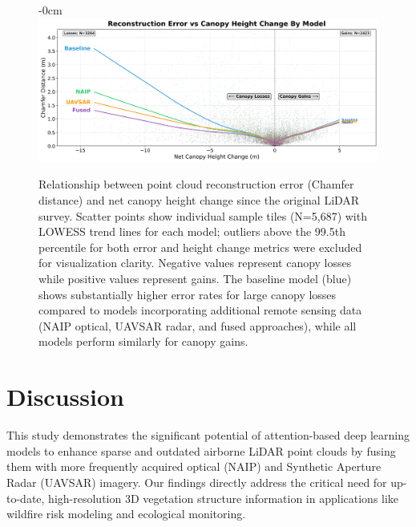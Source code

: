 \documentclass[remotesensing,article,submit,pdftex,moreauthors]{Definitions/mdpi}
\newenvironment{widefigure}[1][]{%
  \begin{figure}[#1]\begin{adjustwidth}{-\extralength}{0cm}\centering}{%
  \end{adjustwidth}\end{figure}}
\begin{document}
\begin{widefigure}
    \vspace{-20pt}
    \centering
    \includegraphics[width=1\linewidth]{manuscript/figures/error_vs_cnpy_chng.png}
    \caption{Relationship between point cloud reconstruction error (Chamfer distance) and net canopy height change since the original LiDAR survey. Scatter points show individual sample tiles (N=5,687) with LOWESS trend lines for each model; outliers above the 99.5th percentile for both error and height change metrics were excluded for visualization clarity. Negative values represent canopy losses while positive values represent gains. The baseline model (blue) shows substantially higher error rates for large canopy losses compared to models incorporating additional remote sensing data (NAIP optical, UAVSAR radar, and fused approaches), while all models perform similarly for canopy gains.}
    \label{fig:error_vs_cnpy_chng}
\end{widefigure}

\section{Discussion}



This study demonstrates the significant potential of attention-based deep learning models to enhance sparse and outdated airborne LiDAR point clouds by fusing them with more frequently acquired optical (NAIP) and Synthetic Aperture Radar (UAVSAR) imagery. Our findings directly address the critical need for up-to-date, high-resolution 3D vegetation structure information in applications like wildfire risk modeling and ecological monitoring.
\end{document}
